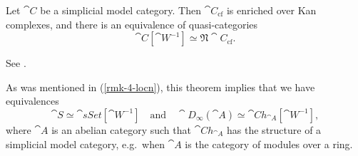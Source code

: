 \begin{theorem}
    Let $\cat{C}$ be a simplicial model category.
    Then $\cat{C}_{\mathrm{cf}}$ is enriched over Kan complexes,
    and there is an equivalence of quasi-categories 
    \[ \cat{C}[\cat{W}^{-1}] \simeq \mathfrak{N}\cat{C}_{\mathrm{cf}}. \]
\end{theorem}

See \cite[Theorem~1.3.4.20]{ha}.

\begin{example}
    As was mentioned in (\ref{rmk-4-locn}),
    this theorem implies that we have equivalences
    \[ \cat S\simeq\cat{sSet}[\cat W^{-1}]\quad\text{and}\quad
    \cat D_\infty(\cat A)\simeq\cat{Ch}_{\cat A}[\cat W^{-1}], \]
    where $\cat{A}$ is an abelian category such that
    $\cat{Ch}_{\cat{A}}$ has the structure of a simplicial model category,
    e.g.\ when $\cat{A}$ is the category of modules over a ring.
    \varqed
\end{example}


